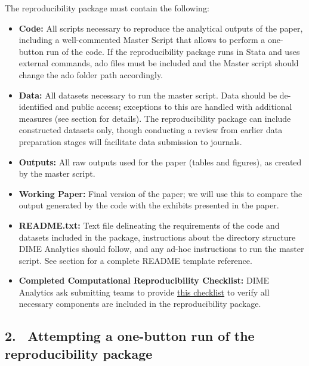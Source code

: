 \begin{fullwidth}
The reproducibility package must contain the following:

	\bigskip

	\begin{itemize}
		\setlength\itemsep{-0.1em}
		\item \textbf{Code:} All scripts necessary to reproduce the analytical outputs of the paper, including a well-commented Master Script that allows to perform a one-button run of the code. If the reproducibility package runs in Stata and uses external commands, ado files must be included and the Master script should change the ado folder path accordingly.
		\item \textbf{Data:} All datasets necessary to run the master script. Data should be de-identified and public access; exceptions to this are handled with additional measures (see section  for details). The reproducibility package can include constructed datasets only, though conducting a review from earlier data preparation stages will facilitate data submission to journals.
		\item \textbf{Outputs:} All raw outputs used for the paper (tables and figures), as created by the master script.
		\item \textbf{Working Paper:} Final version of the paper; we will use this to compare the output generated by the code with the exhibits presented in the paper.
		\item \textbf{README.txt:} Text file delineating the requirements of the code and datasets included in the package, instructions about the directory structure DIME Analytics should follow, and any ad-hoc instructions to run the master script. See section  for a complete README template reference.
		\item \textbf{Completed Computational Reproducibility Checklist:} DIME Analytics ask submitting teams to provide \href{https://raw.githubusercontent.com/worldbank/dime-standards/master/dime-research-standards/pillar-3-research-reproducibility/checklists/Reproducibility%20package%20submission%20checklist.pdf}{this checklist} to verify all necessary components are included in the reproducibility package.
	\end{itemize}

	\subsection{2. \, Attempting a one-button run of the reproducibility package}


\end{fullwidth}
